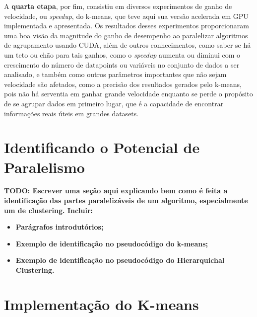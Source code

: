 \documentclass[12pt,
openright, 
oneside, %
a4paper,    %
brazil]{facom-ufu-abntex2}
\begin{document}
A \textbf{quarta etapa}, por fim, consistiu em diversos experimentos de ganho de velocidade, ou \textit{speedup}, do k-means, que teve aqui sua versão acelerada em GPU implementada e apresentada. Os resultados desses experimentos proporcionaram uma boa visão da magnitude do ganho de desempenho ao paralelizar algoritmos de agrupamento usando CUDA, além de outros conhecimentos, como saber se há um teto ou chão para tais ganhos, como o \textit{speedup} aumenta ou diminui com o crescimento do número de datapoints ou variáveis no conjunto de dados a ser analisado, e também como outros parâmetros importantes que não sejam velocidade são afetados, como a precisão dos resultados gerados pelo k-means, pois não há serventia em ganhar grande velocidade enquanto se perde o propósito de se agrupar dados em primeiro lugar, que é a capacidade de encontrar informações reais úteis em grandes datasets.




\section{Identificando o Potencial de Paralelismo}
\label{chp:identifPotencParalel}

\textbf{TODO: Escrever uma seção aqui explicando bem como é feita a identificação das partes paralelizáveis de um algoritmo, especialmente um de clustering. Incluir:}

\begin{itemize}
  \item \textbf{Parágrafos introdutórios;}


  \item \textbf{Exemplo de identificação no pseudocódigo do k-means;}

  \item \textbf{Exemplo de identificação no pseudocódigo do Hierarquichal Clustering.}
\end{itemize}




\section{Implementação do K-means}
\label{sec:kMeansImplementações}
\end{document}
